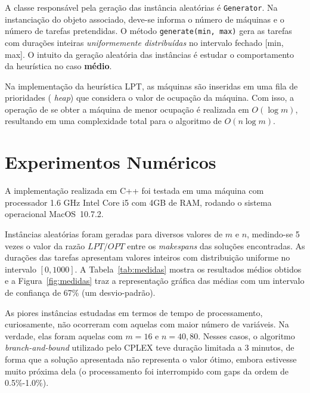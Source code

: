 \documentclass[12pt,a4paper]{article}
\newcommand{\zerar}{\setcounter{equation}{0}\setcounter{figure}{0}\setcounter{table}{0}}
\begin{document}
A classe responsável pela geração das instância aleatórias é \verb|Generator|. Na instanciação do 
objeto associado, deve-se informa o número de máquinas e o número de tarefas pretendidas. O método 
\verb|generate(min, max)| gera as tarefas com durações inteiras {\it uniformemente distribuídas} no 
intervalo fechado [min, max]. O intuito da geração aleatória das instâncias é estudar o 
comportamento da heurística no caso {\bf médio}.

Na implementação da heurística LPT, as máquinas são inseridas em uma fila de prioridades ({\it 
heap}) que considera o valor de ocupação da máquina. Com isso, a operação de se obter a máquina de 
menor ocupação é realizada em $O(\log m)$, resultando em uma complexidade total para o algoritmo de 
$O(n \log m)$.


\zerar
\section{Experimentos Numéricos}

A implementação realizada em C++ foi testada em uma máquina com processador 1.6 GHz Intel Core i5 
com 4GB de RAM, rodando o sistema operacional MacOS~10.7.2. 

Instâncias aleatórias foram geradas para diversos valores de $m$ e $n$, medindo-se 5 vezes o valor 
da razão $LPT/OPT$ entre os {\it makespans} das soluções encontradas. As durações das tarefas 
apresentam valores inteiros com distribuição uniforme no intervalo $[0, 1000]$. A 
Tabela~\ref{tab:medidas} mostra os resultados médios obtidos e a Figura~\ref{fig:medidas} traz a 
representação gráfica das médias com um intervalo de confiança de 67\% (um desvio-padrão).

As piores instâncias estudadas em termos de tempo de processamento, curiosamente, não ocorreram com
aquelas com maior número de variáveis. Na verdade, elas foram aquelas com $m = 16$ e $n = 40, 80$.
Nesses casos, o algoritmo {\it branch-and-bound} utilizado pelo CPLEX teve duração limitada a 3 
minutos, de forma que a solução apresentada não representa o valor ótimo, embora estivesse muito 
próxima dela (o processamento foi interrompido com gaps da ordem de 0.5\%-1.0\%).
\end{document}
